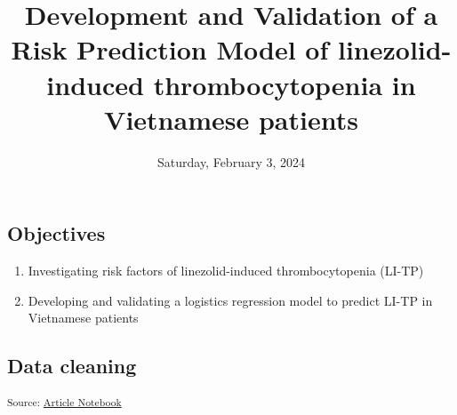 \documentclass[
  letterpaper,
  DIV=11,
  numbers=noendperiod]{scrartcl}
\title{Development and Validation of a Risk Prediction Model of
linezolid-induced thrombocytopenia in Vietnamese patients}
\author{}
\date{Saturday, February 3, 2024}
\providecommand{\tightlist}{%
  \setlength{\itemsep}{0pt}\setlength{\parskip}{0pt}}\usepackage{longtable,booktabs,array}
\begin{document}
\maketitle

\subsection{Objectives}\label{objectives}

\begin{enumerate}
\def\labelenumi{\arabic{enumi}.}
\tightlist
\item
  Investigating risk factors of linezolid-induced thrombocytopenia
  (LI-TP)
\item
  Developing and validating a logistics regression model to predict
  LI-TP in Vietnamese patients
\end{enumerate}

\subsection{Data cleaning}\label{data-cleaning}

\textsubscript{Source:
\href{https://AnTangQuoc.github.io/LZD-TP-pred-model/index.qmd.html}{Article
Notebook}}
\end{document}
